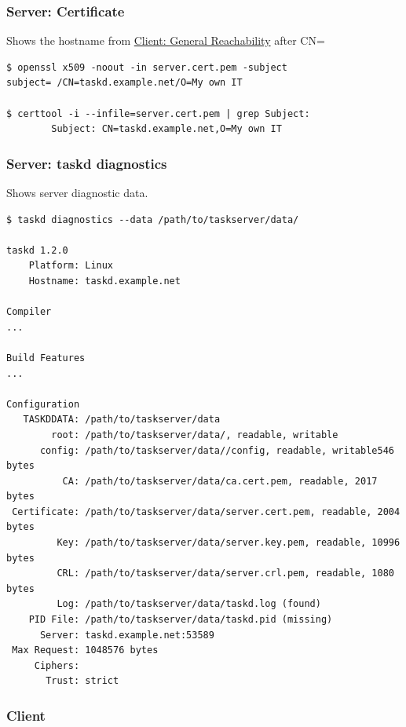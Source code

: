 \documentclass[t,handout]{beamer}
\begin{document}
\begin{frame}[fragile]\frametitle{Server: Certificate}\label{S3}
    \vfill
    Shows the hostname from \hyperlink{C1}{Client: General Reachability} after CN=
    \begin{lstlisting}
$ openssl x509 -noout -in server.cert.pem -subject
subject= /CN=taskd.example.net/O=My own IT

$ certtool -i --infile=server.cert.pem | grep Subject:
        Subject: CN=taskd.example.net,O=My own IT\end{lstlisting}

\end{frame}

\begin{frame}[fragile]\frametitle{Server: taskd diagnostics}\label{S4}
    \vfill
    Shows server diagnostic data.
    \begin{lstlisting}
$ taskd diagnostics --data /path/to/taskserver/data/

taskd 1.2.0
    Platform: Linux
    Hostname: taskd.example.net

Compiler
...

Build Features
...

Configuration
   TASKDDATA: /path/to/taskserver/data
        root: /path/to/taskserver/data/, readable, writable
      config: /path/to/taskserver/data//config, readable, writable546 bytes
          CA: /path/to/taskserver/data/ca.cert.pem, readable, 2017 bytes
 Certificate: /path/to/taskserver/data/server.cert.pem, readable, 2004 bytes
         Key: /path/to/taskserver/data/server.key.pem, readable, 10996 bytes
         CRL: /path/to/taskserver/data/server.crl.pem, readable, 1080 bytes
         Log: /path/to/taskserver/data/taskd.log (found)
    PID File: /path/to/taskserver/data/taskd.pid (missing)
      Server: taskd.example.net:53589
 Max Request: 1048576 bytes
     Ciphers:
       Trust: strict\end{lstlisting}
\end{frame}

\subsubsection{Client}
\end{document}
